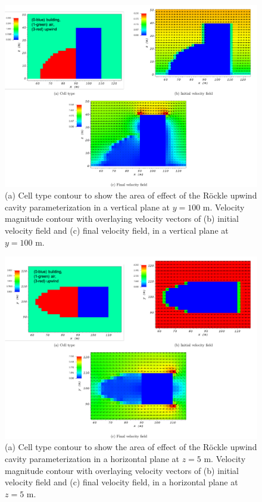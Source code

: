 \begin{figure}[h!]
    \centering
    \includegraphics[width=\textwidth]{Images/upwind_y_100_1.pdf}
    \caption{(a) Cell type contour to show the area of effect of the R\"{o}ckle upwind cavity parameterization in a vertical plane at $y=100$ m. Velocity magnitude contour with overlaying velocity vectors of (b) initial velocity field and (c) final velocity field, in a vertical plane at $y=100$ m.}
\end{figure}

\begin{figure}[h!]
    \centering
    \includegraphics[width=\textwidth]{Images/upwind_z_5_1.pdf}
    \caption{(a) Cell type contour to show the area of effect of the R\"{o}ckle upwind cavity parameterization in a horizontal plane at $z=5$ m. Velocity magnitude contour with overlaying velocity vectors of (b) initial velocity field and (c) final velocity field, in a horizontal plane at $z=5$ m.}
\end{figure}

